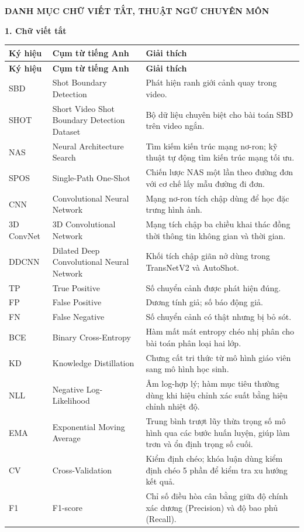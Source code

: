 {}

\begin{center}
{\large\bfseries{DANH MỤC CHỮ VIẾT TẮT, THUẬT NGỮ CHUYÊN MÔN}}
\end{center}

\vspace{1em}

\noindent\textbf{1. Chữ viết tắt}

{
\small
\renewcommand{\arraystretch}{1.2}
\begin{longtable}{L{2.6cm}L{4.8cm}L{6.3cm}}
\toprule
\textbf{Ký hiệu} & \textbf{Cụm từ tiếng Anh} & \textbf{Giải thích} \\
\midrule
\endfirsthead
\toprule
\textbf{Ký hiệu} & \textbf{Cụm từ tiếng Anh} & \textbf{Giải thích} \\
\midrule
\endhead
SBD & Shot Boundary Detection & Phát hiện ranh giới cảnh quay trong video. \\
SHOT & Short Video Shot Boundary Detection Dataset & Bộ dữ liệu chuyên biệt cho bài toán SBD trên video ngắn. \\
NAS & Neural Architecture Search & Tìm kiếm kiến trúc mạng nơ-ron; kỹ thuật tự động tìm kiến trúc mạng tối ưu. \\
SPOS & Single-Path One-Shot & Chiến lược NAS một lần theo đường đơn với cơ chế lấy mẫu đường đi đơn. \\
CNN & Convolutional Neural Network & Mạng nơ-ron tích chập dùng để học đặc trưng hình ảnh. \\
3D ConvNet & 3D Convolutional Network & Mạng tích chập ba chiều khai thác đồng thời thông tin không gian và thời gian. \\
DDCNN & Dilated Deep Convolutional Neural Network & Khối tích chập giãn nở dùng trong TransNetV2 và AutoShot. \\
TP & True Positive & Số chuyển cảnh được phát hiện đúng. \\
FP & False Positive & Dương tính giả; số báo động giả. \\
FN & False Negative & Số chuyển cảnh có thật nhưng bị bỏ sót. \\
BCE & Binary Cross-Entropy & Hàm mất mát entropy chéo nhị phân cho bài toán phân loại hai lớp. \\
KD & Knowledge Distillation & Chưng cất tri thức từ mô hình giáo viên sang mô hình học sinh. \\
NLL & Negative Log-Likelihood & Âm log-hợp lý; hàm mục tiêu thường dùng khi hiệu chỉnh xác suất bằng hiệu chỉnh nhiệt độ. \\
EMA & Exponential Moving Average & Trung bình trượt lũy thừa trọng số mô hình qua các bước huấn luyện, giúp làm trơn và ổn định trọng số cuối. \\
CV & Cross-Validation & Kiểm định chéo; khóa luận dùng kiểm định chéo 5 phần để kiểm tra xu hướng kết quả. \\
F1 & F1-score & Chỉ số điều hòa cân bằng giữa độ chính xác dương (Precision) và độ bao phủ (Recall). \\
\bottomrule
\end{longtable}
}

